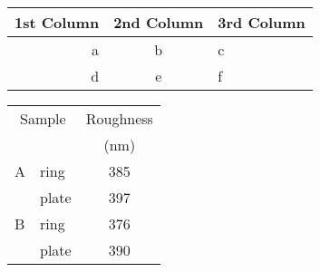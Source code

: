 \documentclass[a4paper,12pt]{article}
\begin{document}
		\begin{tabular}{r|cl}
			1st Column & 2nd Column & 3rd Column\\
			\hline
			a & b & c \\
			\cline{2-3}
			d & e & f\\
		\end{tabular}
		
		
		\begin{tabular}{llc}
			\hline%
			\multicolumn{2}{c}{Sample} & Roughness \\
				& & (nm)\\
			\hline
			A & ring & 385 \\
			\cline{2-3}
			& plate & 397 \\ 
			\hline
			B & ring & 376 \\
			\cline {2-3}
			& plate & 390 \\ 
			\hline
		\end{tabular}
	
\end{document}
